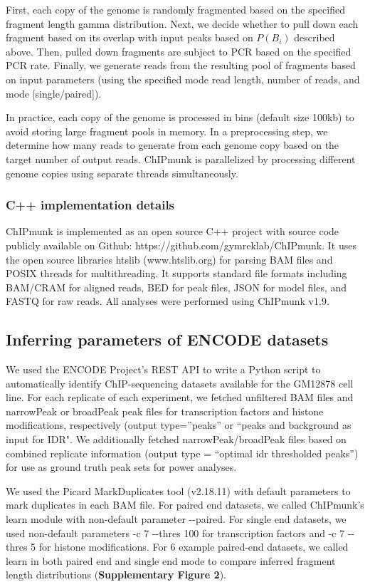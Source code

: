 \documentclass[12pt]{article}
\begin{document}
First, each copy of the genome is randomly fragmented based on the specified fragment length gamma distribution.
Next, we decide whether to pull down each fragment based on its overlap with input peaks based on $P(B_i)$ described above.
Then, pulled down fragments are subject to PCR based on the specified PCR rate.
Finally, we generate reads from the resulting pool of fragments based on input parameters (using the specified mode read length, number of reads, and mode [single/paired]).

In practice, each copy of the genome is processed in bins (default size 100kb) to avoid storing large fragment pools in memory.
In a preprocessing step, we determine how many reads to generate from each genome copy based on the target number of output reads.
ChIPmunk is parallelized by processing different genome copies using separate threads simultaneously.

\subsubsection*{C++ implementation details}
ChIPmunk is implemented as an open source C++ project with source code publicly available on Github: https://github.com/gymreklab/ChIPmunk.
It uses the open source libraries htslib (www.htslib.org) for parsing BAM files and POSIX threads for multithreading.
It supports standard file formats including BAM/CRAM for aligned reads, BED for peak files, JSON for model files, and FASTQ for raw reads.
All analyses were performed using ChIPmunk v1.9.

\subsection*{Inferring parameters of ENCODE datasets}

We used the ENCODE Project's REST API to write a Python script to automatically identify ChIP-sequencing datasets available for the GM12878 cell line.
For each replicate of each experiment, we fetched unfiltered BAM files and narrowPeak or broadPeak peak files for transcription factors and histone modifications, respectively (output type=''peaks'' or ``peaks and background as input for IDR".
We additionally fetched narrowPeak/broadPeak files based on combined replicate information (output type = ``optimal idr thresholded peaks'') for use as ground truth peak sets for power analyses.

We used the Picard \cite{picard} MarkDuplicates tool (v2.18.11) with default parameters to mark duplicates in each BAM file.
For paired end datasets, we called ChIPmunk's learn module with non-default parameter -{}-paired.
For single end datasets, we used non-default parameters -c 7 -{}-thres 100 for transcription factors and -c 7 -{}-thres 5 for histone modifications.
For 6 example paired-end datasets, we called learn in both paired end and single end mode to compare inferred fragment length distributions (\textbf{Supplementary Figure 2}).
\end{document}
